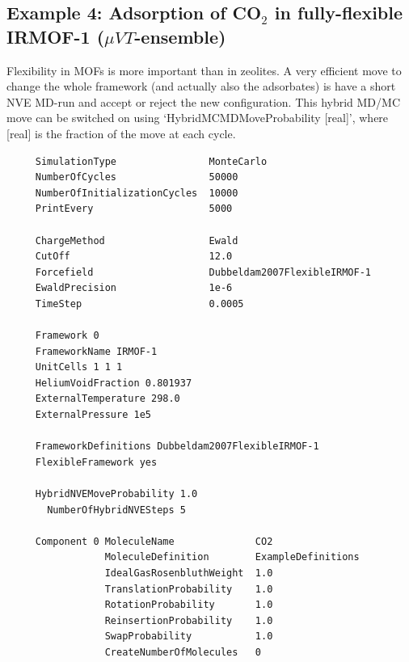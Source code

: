 \subsection*{Example 4: Adsorption of CO$_2$ in fully-flexible IRMOF-1 ($\mu VT$-ensemble)}

Flexibility in MOFs is more important than in zeolites. A very efficient move to change the whole framework (and actually
also the adsorbates) is have a short NVE MD-run and accept or reject the new configuration. This hybrid MD/MC move can be switched on using
`HybridMCMDMoveProbability  [real]', where [real] is the fraction of the move at each cycle.

\begin{tiny}
\begin{verbatim}
     SimulationType                MonteCarlo
     NumberOfCycles                50000
     NumberOfInitializationCycles  10000
     PrintEvery                    5000
     
     ChargeMethod                  Ewald
     CutOff                        12.0
     Forcefield                    Dubbeldam2007FlexibleIRMOF-1
     EwaldPrecision                1e-6
     TimeStep                      0.0005
     
     Framework 0
     FrameworkName IRMOF-1
     UnitCells 1 1 1
     HeliumVoidFraction 0.801937
     ExternalTemperature 298.0
     ExternalPressure 1e5
     
     FrameworkDefinitions Dubbeldam2007FlexibleIRMOF-1
     FlexibleFramework yes
     
     HybridNVEMoveProbability 1.0
       NumberOfHybridNVESteps 5
     
     Component 0 MoleculeName              CO2
                 MoleculeDefinition        ExampleDefinitions
                 IdealGasRosenbluthWeight  1.0
                 TranslationProbability    1.0
                 RotationProbability       1.0
                 ReinsertionProbability    1.0
                 SwapProbability           1.0
                 CreateNumberOfMolecules   0
\end{verbatim}
\end{tiny}


